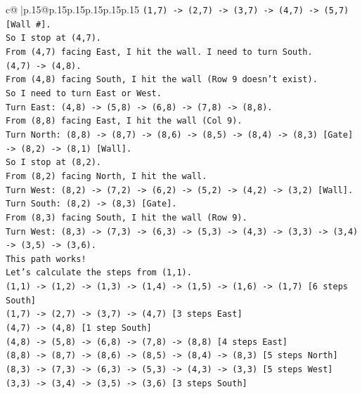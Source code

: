 \documentclass{article}
\begin{document}
{\begin{supertabular}{c@{$\;$}|p{.15\linewidth}@{}p{.15\linewidth}p{.15\linewidth}p{.15\linewidth}p{.15\linewidth}p{.15\linewidth}}
{{{\texttt{(1,7) {-}> (2,7) {-}> (3,7) {-}> (4,7) {-}> (5,7) {[}Wall \#{]}.} \\
\texttt{So I stop at (4,7).} \\
\texttt{From (4,7) facing East, I hit the wall. I need to turn South.} \\
\texttt{(4,7) {-}> (4,8).} \\
\texttt{From (4,8) facing South, I hit the wall (Row 9 doesn't exist).} \\
\texttt{So I need to turn East or West.} \\
\texttt{Turn East: (4,8) {-}> (5,8) {-}> (6,8) {-}> (7,8) {-}> (8,8).} \\
\texttt{From (8,8) facing East, I hit the wall (Col 9).} \\
\texttt{Turn North: (8,8) {-}> (8,7) {-}> (8,6) {-}> (8,5) {-}> (8,4) {-}> (8,3) {[}Gate{]} {-}> (8,2) {-}> (8,1) {[}Wall{]}.} \\
\texttt{So I stop at (8,2).} \\
\texttt{From (8,2) facing North, I hit the wall.} \\
\texttt{Turn West: (8,2) {-}> (7,2) {-}> (6,2) {-}> (5,2) {-}> (4,2) {-}> (3,2) {[}Wall{]}.} \\
\texttt{Turn South: (8,2) {-}> (8,3) {[}Gate{]}.} \\
\texttt{From (8,3) facing South, I hit the wall (Row 9).} \\
\texttt{Turn West: (8,3) {-}> (7,3) {-}> (6,3) {-}> (5,3) {-}> (4,3) {-}> (3,3) {-}> (3,4) {-}> (3,5) {-}> (3,6).} \\
\texttt{This path works!} \\
\texttt{Let's calculate the steps from (1,1).} \\
\texttt{(1,1) {-}> (1,2) {-}> (1,3) {-}> (1,4) {-}> (1,5) {-}> (1,6) {-}> (1,7) {[}6 steps South{]}} \\
\texttt{(1,7) {-}> (2,7) {-}> (3,7) {-}> (4,7) {[}3 steps East{]}} \\
\texttt{(4,7) {-}> (4,8) {[}1 step South{]}} \\
\texttt{(4,8) {-}> (5,8) {-}> (6,8) {-}> (7,8) {-}> (8,8) {[}4 steps East{]}} \\
\texttt{(8,8) {-}> (8,7) {-}> (8,6) {-}> (8,5) {-}> (8,4) {-}> (8,3) {[}5 steps North{]}} \\
\texttt{(8,3) {-}> (7,3) {-}> (6,3) {-}> (5,3) {-}> (4,3) {-}> (3,3) {[}5 steps West{]}} \\
\texttt{(3,3) {-}> (3,4) {-}> (3,5) {-}> (3,6) {[}3 steps South{]}} \\
}}}
\end{supertabular}}
\end{document}
